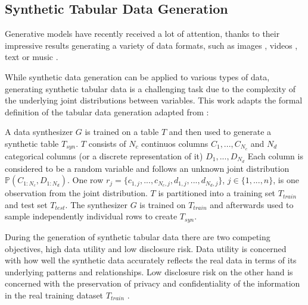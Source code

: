 \subsection{Synthetic Tabular Data Generation}

Generative models have recently received a lot of attention, thanks to their impressive results generating a variety of data formats, 
such as images \cite{ho2020DenoisingDiffusionProbabilistic, dhariwal2021DiffusionModelsBeat, rombach2022HighResolutionImageSynthesis}, videos \cite{ho2022VideoDiffusionModels, Gen1Runway}, text \cite{radfordImprovingLanguageUnderstanding, 2022ChatGPTOptimizingLanguage} or music \cite{agostinelli2023MusicLMGeneratingMusic, martirosRiffusion}.

While synthetic data generation can be applied to various types of data, generating synthetic tabular data is a challenging task due to the complexity of the underlying joint distributions between variables.
This work adapts the formal definition of the tabular data generation adapted from \cite[p. 2]{xu2019ModelingTabularData}:

\begin{displayquote}
    A data synthesizer $G$ is trained on a table $T$ and then used to generate a synthetic table $T_{syn}$. %
    $T$ consists of $N_c$ continuos columns ${C_1, ..., C_{N_c}}$ and $N_d$ categorical columns (or a discrete representation of it) ${D_1, ..., D_{N_d}}$
    Each column is considered to be a random variable and follows an unknown joint distribution $\mathbb{P}(C_{1:N_c},D_{1:N_d})$.
    One row $r_j=\{c_{1,j}, ...,c_{N_c,j}, d_{1,j}, ...,d_{N_d,j}\}$, $j \in\{1, ..., n\}$, is one observation from the joint distribution.
    $T$ is partitioned into a training set $T_{train}$ and test set $T_{test}$. 
    The synthesizer $G$ is trained on $T_{train}$ and afterwards used to sample independently individual rows to create $T_{syn}$.
\end{displayquote}

During the generation of synthetic tabular data there are two competing objectives, high data utility and low disclosure risk.
Data utility is concerned with how well the synthetic data accurately reflects the real data in terms of its underlying patterns and relationships.
Low disclosure risk on the other hand is concerned with the preservation of privacy and confidentiality of the information in the real training dataset $T_{train}$ \cite{little2021GenerativeAdversarialNetworksa}. 

